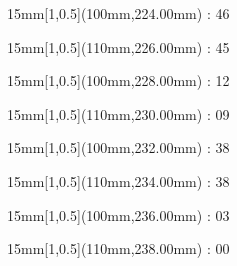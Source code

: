 \documentclass[a5paper]{memoir}
\begin{document}
\begin{textblock*}{15mm}[1,0.5](100mm,224.00mm) : 46\gridstrut\end{textblock*}
\begin{textblock*}{15mm}[1,0.5](110mm,226.00mm) : 45\gridstrut\end{textblock*}
\begin{textblock*}{15mm}[1,0.5](100mm,228.00mm) : 12\gridstrut\end{textblock*}
\begin{textblock*}{15mm}[1,0.5](110mm,230.00mm) : 09\gridstrut\end{textblock*}
\begin{textblock*}{15mm}[1,0.5](100mm,232.00mm) : 38\gridstrut\end{textblock*}
\begin{textblock*}{15mm}[1,0.5](110mm,234.00mm) : 38\gridstrut\end{textblock*}
\begin{textblock*}{15mm}[1,0.5](100mm,236.00mm) : 03\gridstrut\end{textblock*}
\begin{textblock*}{15mm}[1,0.5](110mm,238.00mm) : 00\gridstrut\end{textblock*}
\end{document}
